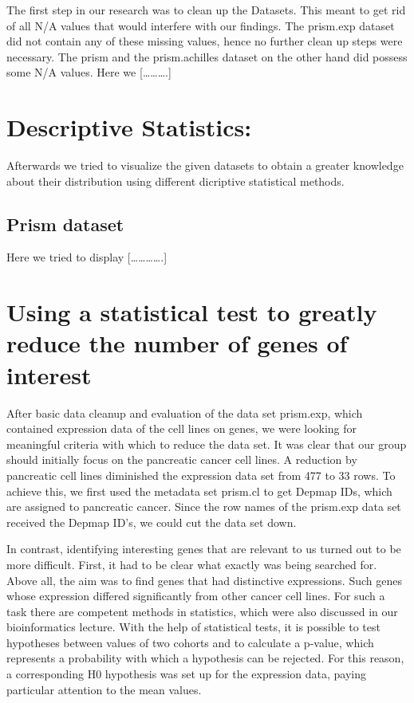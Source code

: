 \documentclass[
]{article}
\begin{document}
The first step in our research was to clean up the Datasets. This meant
to get rid of all N/A values that would interfere with our findings. The
prism.exp dataset did not contain any of these missing values, hence no
further clean up steps were necessary. The prism and the prism.achilles
dataset on the other hand did possess some N/A values. Here we
{[}\ldots\ldots\ldots.{]}

\hypertarget{descriptive-statistics}{%
\section{Descriptive Statistics:}\label{descriptive-statistics}}

Afterwards we tried to visualize the given datasets to obtain a greater
knowledge about their distribution using different dicriptive
statistical methods.

\hypertarget{prism-dataset}{%
\subsection{Prism dataset}\label{prism-dataset}}

Here we tried to display {[}\ldots\ldots\ldots\ldots.{]}

\hypertarget{using-a-statistical-test-to-greatly-reduce-the-number-of-genes-of-interest}{%
\section{Using a statistical test to greatly reduce the number of genes
of
interest}\label{using-a-statistical-test-to-greatly-reduce-the-number-of-genes-of-interest}}

After basic data cleanup and evaluation of the data set prism.exp, which
contained expression data of the cell lines on genes, we were looking
for meaningful criteria with which to reduce the data set. It was clear
that our group should initially focus on the pancreatic cancer cell
lines. A reduction by pancreatic cell lines diminished the expression
data set from 477 to 33 rows. To achieve this, we first used the
metadata set prism.cl to get Depmap IDs, which are assigned to
pancreatic cancer. Since the row names of the prism.exp data set
received the Depmap ID's, we could cut the data set down.

In contrast, identifying interesting genes that are relevant to us
turned out to be more difficult. First, it had to be clear what exactly
was being searched for. Above all, the aim was to find genes that had
distinctive expressions. Such genes whose expression differed
significantly from other cancer cell lines. For such a task there are
competent methods in statistics, which were also discussed in our
bioinformatics lecture. With the help of statistical tests, it is
possible to test hypotheses between values of two cohorts and to
calculate a p-value, which represents a probability with which a
hypothesis can be rejected. For this reason, a corresponding H0
hypothesis was set up for the expression data, paying particular
attention to the mean values.
\end{document}
